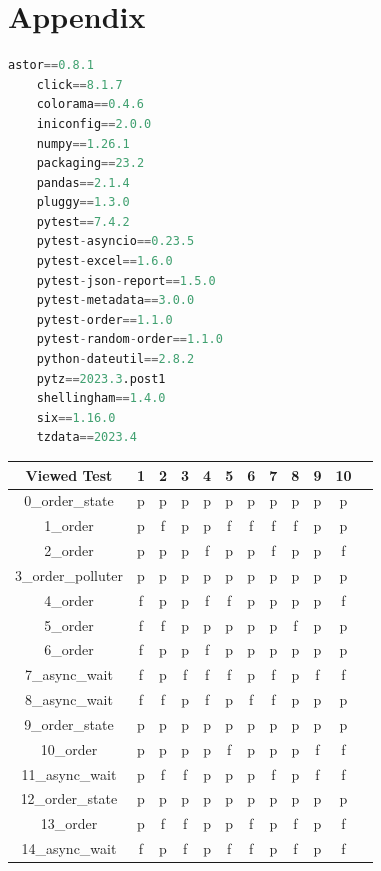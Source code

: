\documentclass[
fancyheadings, %
%
%
]{stsreprt}
\begin{document}
\chapter{Appendix}
\begin{lstlisting}[language=Python, caption={requirements.txt (used packages in the project)}, label=lst:dep]
    astor==0.8.1
    click==8.1.7
    colorama==0.4.6
    iniconfig==2.0.0
    numpy==1.26.1
    packaging==23.2
    pandas==2.1.4
    pluggy==1.3.0
    pytest==7.4.2
    pytest-asyncio==0.23.5
    pytest-excel==1.6.0
    pytest-json-report==1.5.0
    pytest-metadata==3.0.0
    pytest-order==1.1.0
    pytest-random-order==1.1.0
    python-dateutil==2.8.2
    pytz==2023.3.post1
    shellingham==1.4.0
    six==1.16.0
    tzdata==2023.4
\end{lstlisting}

\begin{longtable}{|c|c|c|c|c|c|c|c|c|c|c|c|}
\hline
Viewed Test &  1 &  2 &  3 &  4 &  5 &  6 &  7 &  8 &  9 &  10 \\
\hline
0\_order\_state & p & p & p & p & p & p & p & p & p & p \\
\hline
1\_order & p & f & p & p & f & f & f & f & p & p \\
\hline
2\_order & p & p & p & f & p & p & f & p & p & f \\
\hline
3\_order\_polluter & p & p & p & p & p & p & p & p & p & p \\
\hline
4\_order & f & p & p & f & f & p & p & p & p & f \\
\hline
5\_order & f & f & p & p & p & p & p & f & p & p \\
\hline
6\_order & f & p & p & f & p & p & p & p & p & p \\
\hline
7\_async\_wait & f & p & f & f & f & p & f & p & f & f \\
\hline
8\_async\_wait & f & f & p & f & p & f & f & p & p & p \\
\hline
9\_order\_state & p & p & p & p & p & p & p & p & p & p \\
\hline
10\_order & p & p & p & p & f & p & p & p & f & f \\
\hline
11\_async\_wait & p & f & f & p & p & p & f & p & f & f \\
\hline
12\_order\_state & p & p & p & p & p & p & p & p & p & p \\
\hline
13\_order & p & f & f & p & p & f & p & f & p & f \\
\hline
14\_async\_wait & f & p & f & p & f & f & p & f & p & f \\

\end{longtable}
\end{document}
